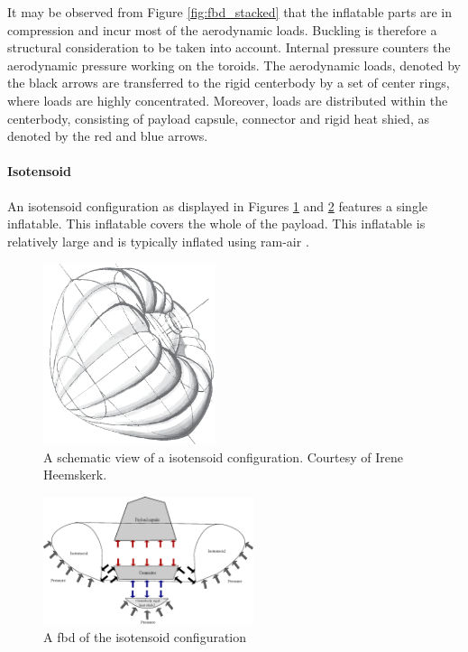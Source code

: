 It may be observed from Figure  \ref{fig:fbd_stacked} that the inflatable parts are in compression and incur most of the aerodynamic loads. Buckling is therefore a structural consideration to be taken into account. Internal pressure counters the aerodynamic pressure working on the toroids. The aerodynamic loads, denoted by the black arrows are transferred to the rigid centerbody by a set of center rings, where loads are highly concentrated. Moreover, loads are distributed within the centerbody, consisting of payload capsule, connector and rigid heat shied, as denoted by the red and blue arrows.


\paragraph{Isotensoid}

An isotensoid configuration as displayed in Figures \ref{fig:conc_iso} and \ref{fig:fbd_iso} features a single inflatable. This inflatable covers the whole of the payload. This inflatable is relatively large and is typically inflated using ram-air \cite{Smith2011}. 

\begin{figure}[H]
\centering
\includegraphics[width = 0.45\textwidth]{Figure/isotensoid.eps}
\caption{A schematic view of a isotensoid configuration. Courtesy of Irene Heemskerk.}
\label{fig:conc_iso}
\end{figure}

\begin{figure}[H]
\centering
\includegraphics[width = 0.55\textwidth]{Figure/FBD_isotensoid.eps}
\caption{A \gls{fbd} of the isotensoid configuration}
\label{fig:fbd_iso}
\end{figure}

